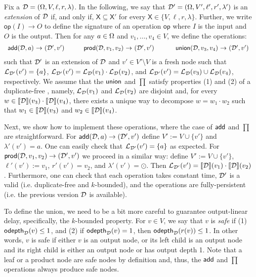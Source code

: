 Fix a \dsabbr{} $\mathcal{D} = (\Omega, V, \ell, r, \lambda)$. In the following, we say that $\mathcal{D}' = (\Omega, V', \ell', r', \lambda')$ is an \emph{extension} of $\mathcal{D}$ if, and only if, $\mathsf{X} \subseteq \mathsf{X}'$ for every $\mathsf{X} \in \{V, \ell, r, \lambda\}$. Further, we write $\mathsf{op}(I) \rightarrow O$ to define the signature of an operation $\mathsf{op}$ where $I$ is the input and $O$ is the output. 
Then for any $a \in \Omega$ and $v_1, \ldots, v_4 \in V$, we define the operations:
\[
\begin{array}{rclrclrcl}
\add(\D,a) & \!\!\!\!\rightarrow\!\!\!\! & (\D',v')   \ \ \ \ \ \	 & \prod(\D,v_1, v_2) & \!\!\!\! \rightarrow \!\!\!\! & (\D',v')   \ \ \ \ \ \ \ &  \union(\D,v_3, v_4) & \!\!\!\!\rightarrow\!\!\!\! & (\D',v')
\end{array}
\]
\noindent such that $\mathcal{D}'$ is an extension of $\mathcal{D}$  and $v' \in V' \setminus V$ is a fresh node such that $\mathcal{L}_{\mathcal{D}'}(v') = \{a\}$, $\mathcal{L}_{\mathcal{D}'}(v') = \mathcal{L}_{\mathcal{D}}(v_1) \cdot \mathcal{L}_{\mathcal{D}}(v_2)$, and $\mathcal{L}_{\mathcal{D}'}(v') = \mathcal{L}_{\mathcal{D}}(v_3) \cup \mathcal{L}_{\mathcal{D}}(v_4)$, respectively.
We assume that the $\mathsf{union}$ and $\prod$ satisfy properties (1) and (2) of a duplicate-free \dsabbr{}, namely, $\mathcal{L}_{\mathcal{D}}(v_1)$ and $\mathcal{L}_{\mathcal{D}}(v_2)$ are disjoint and, for every $w \in {\llbracket{\mathcal{D}}\rrbracket}(v_3) \cdot {\llbracket{\mathcal{D}}\rrbracket}(v_4)$, there exists a unique way to decompose $w = w_1 \cdot w_2$ such that $w_1 \in {\llbracket{\mathcal{D}}\rrbracket}(v_3)$ and $w_2 \in {\llbracket{\mathcal{D}}\rrbracket}(v_4)$. 


Next, we show how to implement these operations, where the case of $\mathsf{add}$ and $\prod$ are straightforward. For $ \mathsf{add}(\mathcal{D},a) \rightarrow (\mathcal{D}',v')$ define $V' := V \cup \{v'\}$ and $\lambda'(v') = a$. One can easily check that $\mathcal{L}_{\mathcal{D}'}(v') = \{a\}$ as expected. For $\mathsf{prod}(\mathcal{D},v_1, v_2) \rightarrow (\mathcal{D}',v')$ we proceed in a similar way: define $V' := V \cup\{v'\}$, $\ell'(v') :=v_1$, $r'(v') = v_2$, and $\lambda'(v') = \odot$. 
Then $\mathcal{L}_{\mathcal{D}'}(v') = {\llbracket{\mathcal{D}}\rrbracket}(v_1)\cdot{\llbracket{\mathcal{D}}\rrbracket}(v_2)$.
Furthermore, one can check that each operation takes constant time, $\mathcal{D}'$ is a valid \dsabbr{} (i.e. duplicate-free and $k$-bounded), and the operations are fully-persistent (i.e. the previous version $\mathcal{D}$ is available).

To define the union, we need to be a bit more careful to guarantee output-linear delay, specifically, the  $k$-bounded property.
For $v\in V$, we say that $v$ is {\em safe} if (1) $\mathsf{odepth}_{\mathcal{D}}(v) \leq 1$, and (2) if $\mathsf{odepth}_{\mathcal{D}}(v) = 1$, then $\mathsf{odepth}_{\mathcal{D}}(r(v)) \leq 1$. In other words, $v$ is safe if either $v$ is an output node, or its left child is an output node and its right child is either an output node or has output depth 1.
Note that a leaf or a product node are safe nodes by definition and, thus, the $\mathsf{add}$ and $\prod$ operations always produce safe nodes. 

